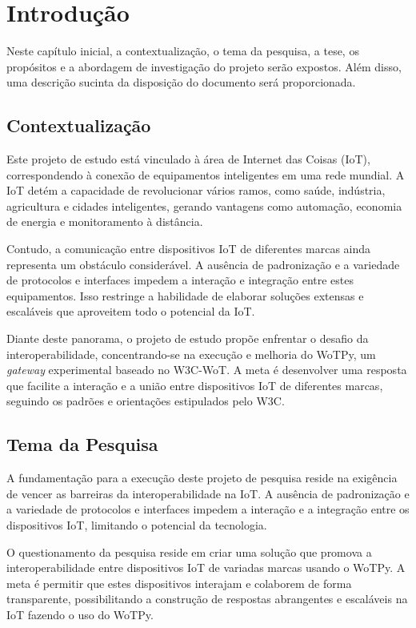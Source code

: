 \chapter{Introdução}

Neste capítulo inicial, a contextualização, o tema da pesquisa, a tese, os propósitos e a abordagem de investigação do projeto serão expostos. Além disso, uma descrição sucinta da disposição do documento será proporcionada.

\section{Contextualização}

Este projeto de estudo está vinculado à área de Internet das Coisas (IoT), correspondendo à conexão de equipamentos inteligentes em uma rede mundial. A IoT detém a capacidade de revolucionar vários ramos, como saúde, indústria, agricultura e cidades inteligentes, gerando vantagens como automação, economia de energia e monitoramento à distância.

Contudo, a comunicação entre dispositivos IoT de diferentes marcas ainda representa um obstáculo considerável. A ausência de padronização e a variedade de protocolos e interfaces impedem a interação e integração entre estes equipamentos. Isso restringe a habilidade de elaborar soluções extensas e escaláveis que aproveitem todo o potencial da IoT.

Diante deste panorama, o projeto de estudo propõe enfrentar o desafio da interoperabilidade, concentrando-se na execução e melhoria do WoTPy, um \textit{gateway} experimental baseado no W3C-WoT. A meta é desenvolver uma resposta que facilite a interação e a união entre dispositivos IoT de diferentes marcas, seguindo os padrões e orientações estipulados pelo W3C.

\section{Tema da Pesquisa}

A fundamentação para a execução deste projeto de pesquisa reside na exigência de vencer as barreiras da interoperabilidade na IoT. A ausência de padronização e a variedade de protocolos e interfaces impedem a interação e a integração entre os dispositivos IoT, limitando o potencial da tecnologia.

O questionamento da pesquisa reside em criar uma solução que promova a interoperabilidade entre dispositivos IoT de variadas marcas usando o WoTPy. A meta é permitir que estes dispositivos interajam e colaborem de forma transparente, possibilitando a construção de respostas abrangentes e escaláveis na IoT fazendo o uso do WoTPy.


